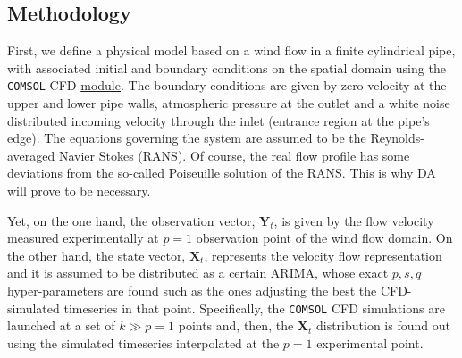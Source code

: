 \documentclass{article}
\theoremstyle{definition}
\theoremstyle{definition}
\theoremstyle{remark}
\theoremstyle{mythmstyle}
\begin{document}
\subsection{Methodology}

First, we define a physical model based on a wind flow in a finite cylindrical pipe, with associated initial and boundary conditions on the spatial domain using the \texttt{COMSOL} CFD \hyperlink{https://www.comsol.com/cfd-module}{module}. The boundary conditions are given by zero velocity at the upper and lower pipe walls, atmospheric pressure at the outlet and a white noise distributed incoming velocity through the inlet (entrance region at the pipe's edge). The equations governing the system are assumed to be the Reynolds-averaged Navier Stokes (RANS). Of course, the real flow profile has some deviations from the so-called Poiseuille solution of the RANS. This is why DA will prove to be necessary.

Yet, on the one hand, the observation vector, $\bm{Y}_t$, is given by the flow velocity measured experimentally at $p=1$ observation point of the wind flow domain. On the other hand, the state vector, $\bm{X}_t$, represents the velocity flow representation and it is assumed to be distributed as a certain ARIMA, whose exact $p, s, q$ hyper-parameters are found such as the ones adjusting the best the CFD-simulated timeseries in that point. Specifically, the \texttt{COMSOL} CFD simulations are launched at a set of $k\gg p=1$ points and, then, the $\bm{X}_t$ distribution is found out using the simulated timeseries interpolated at the $p=1$ experimental point.  
\end{document}
